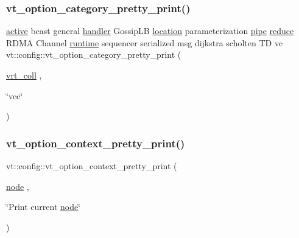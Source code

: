 \subsubsection{\texorpdfstring{vt\+\_\+option\+\_\+category\+\_\+pretty\+\_\+print()}{vt\_option\_category\_pretty\_print()}\hspace{0.1cm}{\footnotesize\ttfamily [16/16]}}
{\footnotesize\ttfamily \hyperlink{namespacevt_1_1config_a6bd1d6215bda0d8ca02811798399f689a82f77c67af0c363709010c6df4dbd920}{active} bcast general \hyperlink{namespacevt_1_1config_a6bd1d6215bda0d8ca02811798399f689a82a0081a94d5c5dfd18b0b3f7eca64b7}{handler} Gossip\+LB \hyperlink{namespacevt_1_1config_a6bd1d6215bda0d8ca02811798399f689aa8d8501591ca3859c828489054b17640}{location} parameterization \hyperlink{namespacevt_1_1config_a6bd1d6215bda0d8ca02811798399f689ad2f6c4149417910966357969e4740fbd}{pipe} \hyperlink{namespacevt_1_1config_a6bd1d6215bda0d8ca02811798399f689af558c370706b5e7bd8ba5224657ca9b4}{reduce} R\+D\+MA Channel \hyperlink{namespacevt_1_1config_a6bd1d6215bda0d8ca02811798399f689afdcadb44dd13617f18aba8d42a257967}{runtime} sequencer serialized msg dijkstra scholten TD vc vt\+::config\+::vt\+\_\+option\+\_\+category\+\_\+pretty\+\_\+print (\begin{DoxyParamCaption}\item[{\hyperlink{namespacevt_1_1config_a6bd1d6215bda0d8ca02811798399f689af18e81338b06e3d1a52b8c095b87c325}{vrt\+\_\+coll}}]{,  }\item[{\char`\"{}vcc\char`\"{}}]{ }\end{DoxyParamCaption})}

\mbox{\label{namespacevt_1_1config_a7318827247b6fe5313529e7c8b2a9a28}} 
\subsubsection{\texorpdfstring{vt\+\_\+option\+\_\+context\+\_\+pretty\+\_\+print()}{vt\_option\_context\_pretty\_print()}}
{\footnotesize\ttfamily vt\+::config\+::vt\+\_\+option\+\_\+context\+\_\+pretty\+\_\+print (\begin{DoxyParamCaption}\item[{\hyperlink{namespacevt_1_1config_a46e57c33bee1b9f1fa95455af86d80e0a576033c81e2ddd03d721ecef3b1b3f81}{node}}]{,  }\item[{\char`\"{}Print current \hyperlink{namespacevt_1_1config_a46e57c33bee1b9f1fa95455af86d80e0a576033c81e2ddd03d721ecef3b1b3f81}{node}\char`\"{}}]{ }\end{DoxyParamCaption})}

